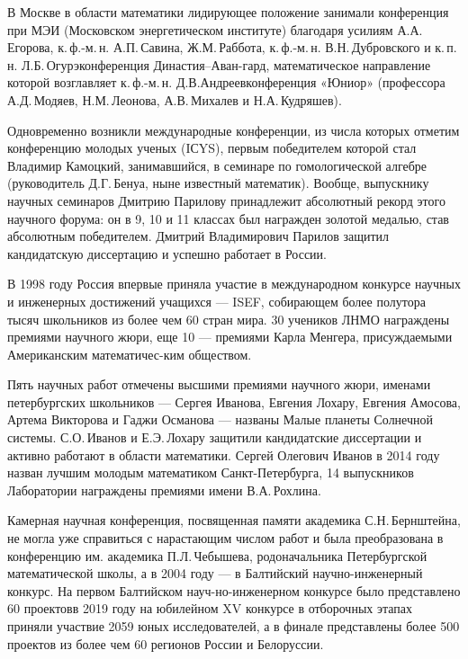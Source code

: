\ms\abz В Москве в области математики лидирующее положение занимали конференция при МЭИ (Московском энергетическом институте) благодаря усилиям А.А.\,Егорова, к.\,ф.-м.\,н. А.П.\,Савина, Ж.М.\,Раббота, к.\,ф.-м.\,н. В.Н.\,Дубровского и к.\,п.\,н. Л.Б.\,Огурэ\scolon конференция Династия–Аван-\linebreak гард, математическое направление которой возглавляет к.\,ф.-м.\,н. Д.В.\linebreak Андреев\scolon конференция «Юниор» (профессора А.Д.\,Модяев, Н.М.\,Леонова, А.В.\,Михалев и Н.А.\,Кудряшев).

\ms\abz Одновременно возникли международные конференции, из числа которых отметим конференцию молодых ученых (IСYS),  первым победителем которой стал Владимир Камоцкий, занимавшийся, в семинаре по гомологической алгебре (руководитель Д.Г.\,Бенуа, ныне известный математик). Вообще, выпускнику научных семинаров Дмитрию Парилову принадлежит абсолютный рекорд этого научного форума: он в 9, 10 и 11 классах был награжден золотой медалью, став абсолютным победителем. Дмитрий Владимирович Парилов защитил кандидатскую диссертацию и успешно работает в России. 

\ms\abz В 1998 году Россия впервые приняла участие в международном конкурсе научных и инженерных достижений учащихся — ISEF, собирающем более полутора тысяч школьников из более чем 60 стран мира. 30 учеников ЛНМО награждены премиями научного жюри, еще 10 — премиями Карла Менгера, присуждаемыми Американским математичес-\linebreak ким обществом.

\ms\abz Пять научных работ отмечены высшими премиями научного жюри, именами петербургских школьников — Сергея Иванова, Евгения Лохару, Евгения Амосова, Артема Викторова и Гаджи Османова — названы Малые планеты Солнечной системы. С.О.\,Иванов и Е.Э.\,Лохару защитили кандидатские диссертации и активно работают в области математики. Сергей Олегович Иванов в 2014 году назван лучшим молодым математиком Санкт-Петербурга, 14 выпускников Лаборатории награждены премиями имени В.А.\,Рохлина.

\ms\abz Камерная научная конференция, посвященная памяти академика С.Н.\,Бернштейна, не могла уже справиться с нарастающим числом работ и была преобразована в конференцию им. академика П.Л.\,Чебышева, родоначальника Петербургской математической школы, а в 2004 году — в Балтийский научно-инженерный конкурс. На первом Балтийском науч-\linebreak но-инженерном конкурсе было представлено 60 проектов\scolon в 2019 году на юбилейном XV конкурсе в отборочных этапах приняли участвие 2059 юных исследователей, а в финале представлены более 500 проектов из более чем 60 регионов России и Белоруссии.

